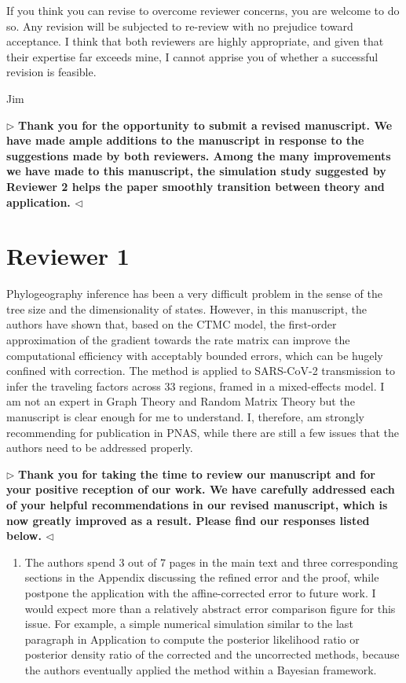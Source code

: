 \documentclass[12pt]{article}
\newenvironment{reply}{$\triangleright$\bfseries}{$\triangleleft$}
\begin{document}
If you think you can revise to overcome reviewer concerns, you are welcome to do so. Any revision will be subjected to re-review with no prejudice toward acceptance. I think that both reviewers are highly appropriate, and given that their expertise far exceeds mine, I cannot apprise you of whether a successful revision is feasible. 

Jim 

\begin{reply}
	Thank you for the opportunity to submit a revised manuscript. We have made ample additions to the manuscript in response to the suggestions made by both reviewers. Among the many improvements we have made to this manuscript, the simulation study suggested by Reviewer 2 helps the paper smoothly transition between theory and application.
\end{reply}


\section*{Reviewer 1}

Phylogeography inference has been a very difficult problem in the sense of the tree size and the dimensionality of states. However, in this manuscript, the authors have shown that, based on the CTMC model, the first-order approximation of the gradient towards the rate matrix can improve the computational efficiency with acceptably bounded errors, which can be hugely confined with correction. The method is applied to SARS-CoV-2 transmission to infer the traveling factors across 33 regions, framed in a mixed-effects model. I am not an expert in Graph Theory and Random Matrix Theory but the manuscript is clear enough for me to understand. I, therefore, am strongly recommending for publication in PNAS, while there are still a few issues that the authors need to be addressed properly.

\begin{reply}
	Thank you for taking the time to review our manuscript and for your positive reception of our work.  We have carefully addressed each of your helpful recommendations in our revised manuscript, which is now greatly improved as a result.  Please find our responses listed below.
\end{reply}

\begin{enumerate}
	\item The authors spend 3 out of 7 pages in the main text and three corresponding sections in the Appendix discussing the refined error and the proof, while postpone the application with the affine-corrected error to future work. I would expect more than a relatively abstract error comparison figure for this issue. For example, a simple numerical simulation similar to the last paragraph in Application to compute the posterior likelihood ratio or posterior density ratio of the corrected and the uncorrected methods, because the authors eventually applied the method within a Bayesian framework.
\end{enumerate}
\end{document}
